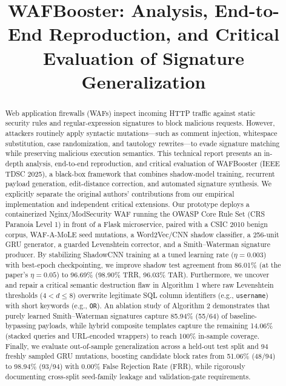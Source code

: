 \documentclass[conference]{IEEEtran}
\begin{document}
\title{WAFBooster: Analysis, End-to-End Reproduction, and Critical Evaluation of Signature Generalization}

\author{
}

\maketitle

\begin{abstract}
Web application firewalls (WAFs) inspect incoming HTTP traffic against static security rules and regular-expression signatures to block malicious requests. However, attackers routinely apply syntactic mutations---such as comment injection, whitespace substitution, case randomization, and tautology rewrites---to evade signature matching while preserving malicious execution semantics. This technical report presents an in-depth analysis, end-to-end reproduction, and critical evaluation of WAFBooster (IEEE TDSC 2025), a black-box framework that combines shadow-model training, recurrent payload generation, edit-distance correction, and automated signature synthesis. We explicitly separate the original authors' contributions from our empirical implementation and independent critical extensions. Our prototype deploys a containerized Nginx/ModSecurity WAF running the OWASP Core Rule Set (CRS Paranoia Level 1) in front of a Flask microservice, paired with a CSIC 2010 benign corpus, WAF-A-MoLE seed mutations, a Word2Vec/CNN shadow classifier, a 256-unit GRU generator, a guarded Levenshtein corrector, and a Smith--Waterman signature producer. By stabilizing ShadowCNN training at a tuned learning rate ($\eta=0.003$) with best-epoch checkpointing, we improve shadow test agreement from 86.01\% (at the paper's $\eta=0.05$) to 96.69\% (98.90\% TRR, 96.03\% TAR). Furthermore, we uncover and repair a critical semantic destruction flaw in Algorithm 1 where raw Levenshtein thresholds ($4 < d \le 8$) overwrite legitimate SQL column identifiers (e.g., \texttt{username}) with short keywords (e.g., \texttt{OR}). An ablation study of Algorithm 2 demonstrates that purely learned Smith--Waterman signatures capture 85.94\% (55/64) of baseline-bypassing payloads, while hybrid composite templates capture the remaining 14.06\% (stacked queries and URL-encoded wrappers) to reach 100\% in-sample coverage. Finally, we evaluate out-of-sample generalization across a held-out test split and 94 freshly sampled GRU mutations, boosting candidate block rates from 51.06\% (48/94) to 98.94\% (93/94) with 0.00\% False Rejection Rate (FRR), while rigorously documenting cross-split seed-family leakage and validation-gate requirements.
\end{abstract}
\end{document}
